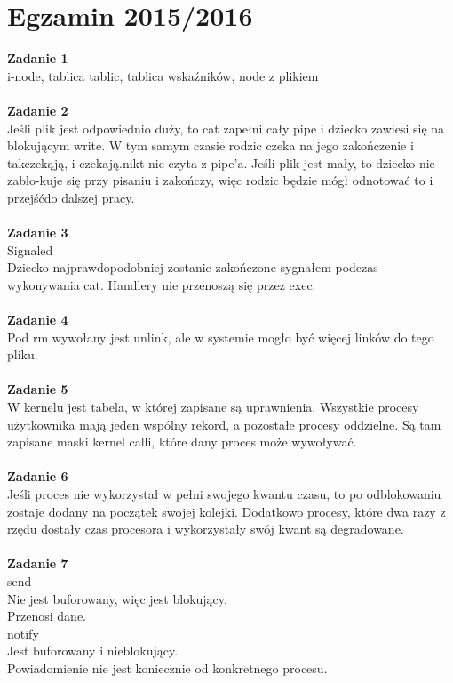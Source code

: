 \documentclass[12pt, a4paper, polish, openany]{book}
\begin{document}
\section{Egzamin 2015/2016}
\textbf{Zadanie 1} \\
i-node, tablica tablic, tablica wskaźników, node z plikiem \\\\
\textbf{Zadanie 2} \\
Jeśli plik jest odpowiednio duży, to cat zapełni cały pipe i dziecko zawiesi się na blokującym write. W tym samym czasie rodzic czeka na jego zakończenie i takczekąją, i czekają.nikt nie czyta z pipe’a. Jeśli plik jest mały, to dziecko nie zablo-kuje się przy pisaniu i zakończy, więc rodzic będzie mógł odnotować to i przejśćdo dalszej pracy. \\\\
\textbf{Zadanie 3} \\
Signaled \\
Dziecko najprawdopodobniej zostanie zakończone sygnałem podczas wykonywania cat. Handlery nie przenoszą się przez exec. \\\\
\textbf{Zadanie 4} \\
Pod rm wywołany jest unlink, ale w systemie mogło być więcej linków do tego pliku. \\\\
\textbf{Zadanie 5} \\
W kernelu jest tabela, w której zapisane są uprawnienia. Wszystkie procesy użytkownika mają jeden wspólny rekord, a pozostałe procesy oddzielne. Są tam zapisane maski kernel calli, które dany proces może wywoływać. \\\\
\textbf{Zadanie 6} \\
Jeśli proces nie wykorzystał w pełni swojego kwantu czasu, to po odblokowaniu zostaje dodany
na początek swojej kolejki. Dodatkowo procesy, które dwa razy z rzędu dostały czas procesora i wykorzystały swój kwant są degradowane. \\\\
\textbf{Zadanie 7} \\
send \\
Nie jest buforowany, więc jest blokujący. \\
Przenosi dane. \\
notify \\
Jest buforowany i nieblokujący. \\
Powiadomienie nie jest koniecznie od konkretnego procesu. \\
\end{document}
